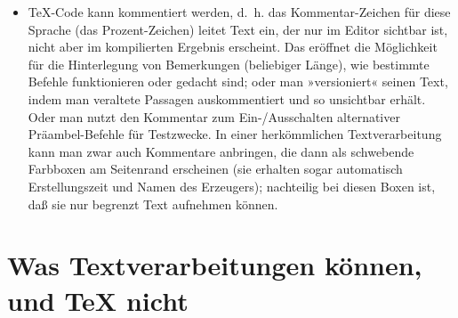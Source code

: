 \documentclass[11pt,a4paper,ngerman,DIV=8]{scrartcl}
\begin{document}
\begin{itemize}
  \item \TeX{}-Code kann kommentiert werden, d.~h. das Kommentar-Zeichen für diese Sprache (das Prozent-Zeichen) leitet Text ein, der nur im Editor sichtbar ist, nicht aber im kompilierten Ergebnis erscheint. Das eröffnet die Möglichkeit für die Hinterlegung von Bemerkungen (beliebiger Länge), wie bestimmte Befehle funktionieren oder gedacht sind; oder man »versioniert« seinen Text, indem man veraltete Passagen auskommentiert und so unsichtbar erhält. Oder man nutzt den Kommentar zum Ein-/Ausschalten alternativer Präambel-Befehle für Testzwecke. In einer herkömmlichen Textverarbeitung kann man zwar auch Kommentare anbringen, die dann als schwebende Farbboxen am Seitenrand erscheinen (sie erhalten sogar automatisch Erstellungszeit und Namen des Erzeugers); nachteilig bei diesen Boxen ist, daß sie nur begrenzt Text aufnehmen können.
\end{itemize}

\section{Was Textverarbeitungen können, und \TeX{} nicht}
\end{document}
